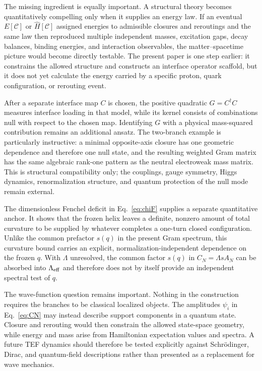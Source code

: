 \documentclass[10pt]{article}
\begin{document}
The missing ingredient is equally important. A structural theory becomes quantitatively compelling only when it supplies an energy law. If an eventual $E[\mathcal C]$ or $\hat H[\mathcal C]$ assigned energies to admissible closures and reroutings and the same law then reproduced multiple independent masses, excitation gaps, decay balances, binding energies, and interaction observables, the matter--spacetime picture would become directly testable. The present paper is one step earlier: it constrains the allowed structure and constructs an interface operator scaffold, but it does not yet calculate the energy carried by a specific proton, quark configuration, or rerouting event.

After a separate interface map $C$ is chosen, the positive quadratic $G=C^\dagger C$ measures interface loading in that model, while its kernel consists of combinations null with respect to the chosen map. Identifying $G$ with a physical mass-squared contribution remains an additional ansatz. The two-branch example is particularly instructive: a minimal opposite-axis closure has one geometric dependence and therefore one null state, and the resulting weighted Gram matrix has the same algebraic rank-one pattern as the neutral electroweak mass matrix. This is structural compatibility only; the couplings, gauge symmetry, Higgs dynamics, renormalization structure, and quantum protection of the null mode remain external.

The dimensionless Fenchel deficit in Eq.~\eqref{eq:chiF} supplies a separate quantitative anchor. It shows that the frozen helix leaves a definite, nonzero amount of total curvature to be supplied by whatever completes a one-turn closed configuration. Unlike the common prefactor $s(q)$ in the present Gram spectrum, this curvature bound carries an explicit, normalization-independent dependence on the frozen $q$. With $\Lambda$ unresolved, the common factor $s(q)$ in $C_N=\Lambda s A_N$ can be absorbed into $\Lambda_{\rm eff}$ and therefore does not by itself provide an independent spectral test of $q$.

The wave-function question remains important. Nothing in the construction requires the branches to be classical localized objects. The amplitudes $\psi_i$ in Eq.~\eqref{eq:CN} may instead describe support components in a quantum state. Closure and rerouting would then constrain the allowed state-space geometry, while energy and mass arise from Hamiltonian expectation values and spectra. A future TEF dynamics should therefore be tested explicitly against Schr\"odinger, Dirac, and quantum-field descriptions rather than presented as a replacement for wave mechanics.
\end{document}
